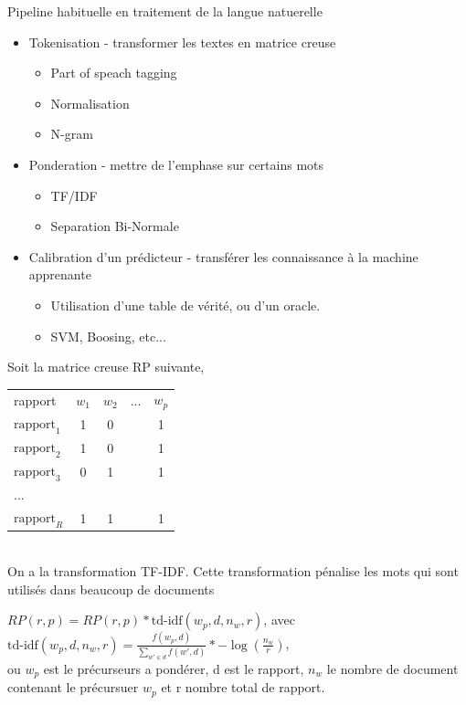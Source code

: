 \begin{frame}	
	Pipeline habituelle en traitement de la langue natuerelle
	
	\begin{itemize}
		\item Tokenisation - transformer les textes en matrice creuse
		\begin{itemize}
			\item Part of speach tagging
			\item Normalisation
			\item N-gram
		\end{itemize}
		
		\item Ponderation - mettre de l'emphase sur certains mots
		\begin{itemize}
			\item TF/IDF
			\item Separation Bi-Normale
		\end{itemize}
		
		\item Calibration d'un prédicteur - transférer les connaissance à la machine apprenante
		\begin{itemize}
			\item Utilisation d'une table de vérité, ou d'un oracle.
			\item SVM, Boosing, etc...
		\end{itemize}
		
	\end{itemize}
\end{frame}

\begin{frame}[t]
	
	Soit la matrice creuse RP suivante, \\
	\begin{tabular}[t]{lcccc}
		rapport & $w_1$ & $w_2$ & ... & $w_p$ \\
		$\textrm{rapport}_1$ & 1 & 0 &  & 1 \\
		$\textrm{rapport}_2$ & 1 & 0 &  & 1 \\
		$\textrm{rapport}_3$ & 0 & 1 &  & 1 \\
		... &  &  &  & \\
		$\textrm{rapport}_R$ & 1 & 1 &  & 1 \\
	\end{tabular}\\
	\bigskip
	On a la transformation TF-IDF. Cette transformation pénalise les mots qui sont utilisés dans beaucoup de documents\\
	\bigskip
	
	$RP(r, p) = RP(r, p) * \textrm{td-idf}(w_p, d, n_w, r)$, avec \\
	$\textrm{td-idf}(w_p, d, n_w, r) = \frac{f(w_p, d)}{\sum_{w' \in d}f(w', d)} * -\log(\frac{n_w}{r})$,\\
	ou $w_p$ est le précurseurs a pondérer, d est le rapport,  $n_w$ le nombre de document contenant le précursuer $w_p$ et r nombre total de rapport.	
	
\end{frame}
	

